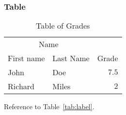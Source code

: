 \subsubsection{Table}

\lipsum[13] %

\begin{table}[hbt]
\caption{Table of Grades}
\centering
\begin{tabular}{llr}
\toprule
\multicolumn{2}{c}{Name} \\
\cmidrule(r){1-2}
First name & Last Name & Grade \\
\midrule
John & Doe & $7.5$ \\
Richard & Miles & $2$ \\
\bottomrule
\end{tabular}
\label{tab:label}
\end{table}

Reference to Table~\vref{tab:label}. %




